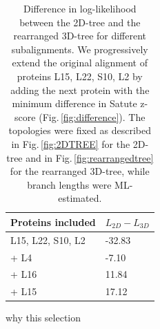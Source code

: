     \begin{table}[ht]
    \centering
\begin{tabular}{ | m{3cm} | m{2cm}| }  
  \hline
  Proteins included & $L_{2D}-L_{3D}$\\ 
  \hline
  L15, L22, S10, L2 & -32.83 \\ 
  \hline
  + L4 & -7.10 \\ 
   \hline
  + L16 & 11.84 \\ 
   \hline
  + L15 & 17.12 \\ 
  \hline
\end{tabular}
\caption{Difference in log-likelihood between the 2D-tree and the rearranged 3D-tree for different subalignments. We progressively extend the original alignment of proteins L15, L22, S10, L2  by adding the next protein with the minimum difference in Satute z-score (Fig.\,\ref{fig:difference}). The topologies were fixed as described in Fig.\,\ref{fig:2DTREE} for the 2D-tree and in Fig.\,\ref{fig:rearrangedtree} for the rearranged 3D-tree, while branch lengths were ML-estimated. }
\label{table:1}
\end{table}

{\color{red}why this selection}

\clearpage

